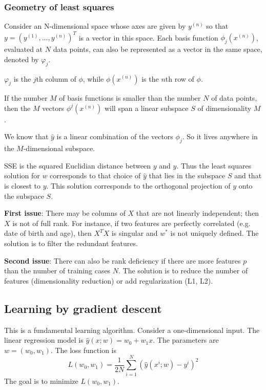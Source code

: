 \documentclass[a4paper,12pt]{article}
\begin{document}
\subsubsection{Geometry of least squares}

Consider an N-dimensional space whose axes are given by $y^{(n)}$ so that $y = (y^{(1)}, ..., y^{(n)})^T$ is a vector in this space. Each basis function $\phi_j(x^{(n)})$, evaluated at $N$ data points, can also be represented as a vector in the same space, denoted by $\varphi_j$. 

$\varphi_j$ is the $j$th column of $\phi$, while $\phi(x^{(n)})$ is the $n$th row of $\phi$. 

If the number $M$ of basis functions is smaller than the number $N$ of data points, then the $M$ vectors $\phi^j(x^{(n)})$ will span a linear subspace $S$ of dimensionality $M$. 

We know that $\hat y$ is a linear combination of the vectors $\phi_j$. So it lives anywhere in the $M$-dimensional subspace. 

SSE is the squared Euclidian distance between $y$ and $\hat y$. Thus the least squares solution for $w$ corresponds to that choice of $\hat y$ that lies in the subspace $S$ and that is closest to $y$. This solution corresponds to the orthogonal projection of $y$ onto the subspace $S$. 

\textbf{First issue}: There may be columns of $X$ that are not linearly independent; then $X$ is not of full rank. For instance, if two features are perfectly correlated (e.g. date of birth and age), then $X^TX$ is singular and $w^*$ is not uniquely defined. The solution is to filter the redundant features. 

\textbf{Second issue}: There can also be rank deficiency if there are more features $p$ than the number of training cases $N$. The solution is to reduce the number of features (dimensionality reduction) or add regularization (L1, L2). 

\subsection{Learning by gradient descent}

This is a fundamental learning algorithm. Consider a one-dimensional input. The linear regression model is $\hat y(x; w) = w_0 + w_1x$. The parameters are $w = (w_0, w_1)$. The loss function is 
$$L(w_0, w_1) = \frac{1}{2N} \sum_{i=1}^N\left(\hat y(x^i; w) - y^i\right)^2$$
The goal is to minimize $L(w_0, w_1)$. 
\end{document}
